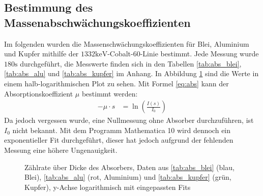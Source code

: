 \documentclass[
	parskip=half,10pt,
	numbers= noenddot, %
	toc=flat, %
	oneside,
	twocolumn,
	]{scrartcl}
\begin{document}
\subsection{Bestimmung des Massenabschwächungskoeffizienten}

Im folgenden wurden die Massenschwächungskoeffizienten für Blei, Aluminium und Kupfer mithilfe der $1332 \si{\kilo \electronvolt}$-Cobalt-60-Linie bestimmt. Jede Messung 
wurde $180 \si{\second}$ durchgeführt, die Messwerte finden sich in den Tabellen \ref{tab:abs_blei}, \ref{tab:abs_alu} und \ref{tab:abs_kupfer} im Anhang. 
In Abbildung \ref{fig:absorption_alle} sind die Werte in einem halb-logarithmischen Plot zu sehen. Mit Formel \ref{eq:abs} kann der Absorptionskoeffizient $\mu$ 
bestimmt werden: 
\begin{align}
- \mu \cdot s &= \ln{\left( \frac{I(s)}{I_0} \right )} 
\end{align}
Da jedoch vergessen wurde, eine Nullmessung ohne Absorber durchzuführen, ist $I_0$ nicht bekannt. Mit dem Programm Mathematica 10 wird dennoch ein exponentieller 
Fit durchgeführt, dieser hat jedoch aufgrund der fehlenden Messung eine höhere Ungenauigkeit. 


\begin{figure}[h!]
\begin{center}
\end{center} 
\caption{Zählrate über Dicke des Absorbers, Daten aus \ref{tab:abs_blei} (blau, Blei), \ref{tab:abs_alu} (rot, Aluminium) und \ref{tab:abs_kupfer} (grün, Kupfer), 
y-Achse logarithmisch mit eingepassten Fits}
\label{fig:absorption_alle}
\end{figure}
\end{document}
